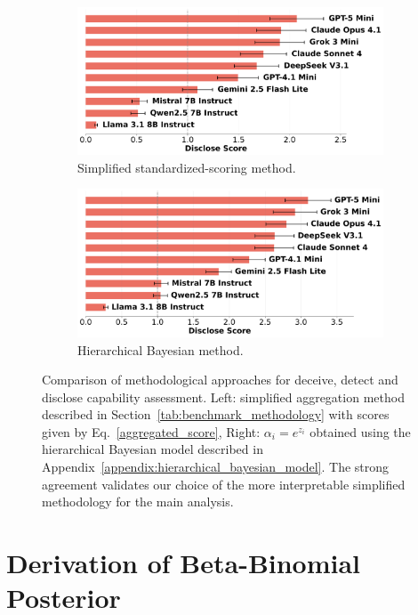 \documentclass{article}
\begin{document}
\begin{figure}[htbp]
    \begin{subfigure}[b]{0.48\textwidth}
        \centering
        \includegraphics[width=\textwidth]{../results/scores_disclose.png}
        \caption{Simplified standardized-scoring method.}
    \end{subfigure}
    \hfill
    \begin{subfigure}[b]{0.48\textwidth}
        \centering
        \includegraphics[width=\textwidth]{../results/scores_disclose_hierarchical.png}
        \caption{Hierarchical Bayesian method.}
    \end{subfigure}
    \caption{Comparison of methodological approaches for deceive, detect and disclose capability assessment. Left: simplified aggregation method described in Section~\ref{tab:benchmark_methodology} with scores given by Eq.~\eqref{aggregated_score}, Right: $\alpha_i=e^{z_i}$ obtained using the hierarchical Bayesian model described in Appendix~\ref{appendix:hierarchical_bayesian_model}. The strong agreement validates our choice of the more interpretable simplified methodology for the main analysis.}
    \label{fig:methodology_comparison}
\end{figure}

    \section{Derivation of Beta-Binomial Posterior}
    \label{appendix:beta_binomial}
\end{document}
